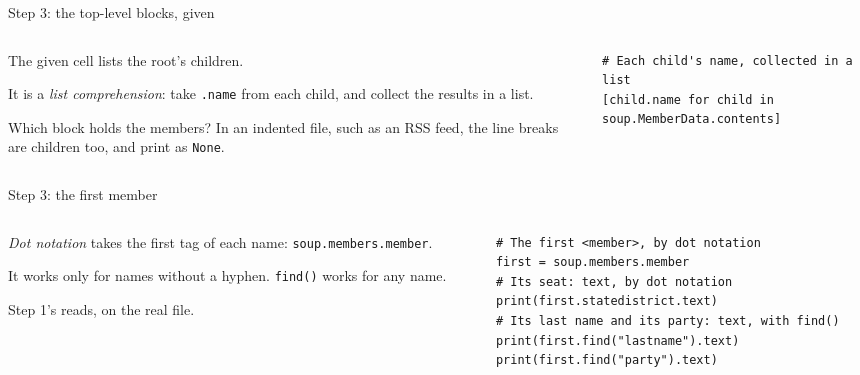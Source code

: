 \documentclass[9pt,aspectratio=169]{beamer}
\begin{document}
\begin{frame}[fragile]{Step 3: the top-level blocks, given}
    \begin{columns}[T]
        \begin{column}{0.37\textwidth}
            The given cell lists the root's children.

            \medskip
            It is a \textit{list comprehension}: take \texttt{.name} from each child, and collect the results in a list.

            \medskip
            Which block holds the members? In an indented file, such as an RSS feed, the line breaks are children too, and print as \texttt{None}.
        \end{column}
        \begin{column}{0.6\textwidth}
\begin{lstlisting}
# Each child's name, collected in a list
[child.name for child in soup.MemberData.contents]
\end{lstlisting}
        \end{column}
    \end{columns}
\end{frame}

\begin{frame}[fragile]{Step 3: the first member}
    \begin{columns}[T]
        \begin{column}{0.37\textwidth}
            \textit{Dot notation} takes the first tag of each name: \texttt{soup.members.member}.

            \medskip
            It works only for names without a hyphen. \texttt{find()} works for any name.

            \medskip
            Step 1's reads, on the real file.
        \end{column}
        \begin{column}{0.6\textwidth}
\begin{lstlisting}
# The first <member>, by dot notation
first = soup.members.member
# Its seat: text, by dot notation
print(first.statedistrict.text)
# Its last name and its party: text, with find()
print(first.find("lastname").text)
print(first.find("party").text)
\end{lstlisting}
        \end{column}
    \end{columns}
\end{frame}
\end{document}

